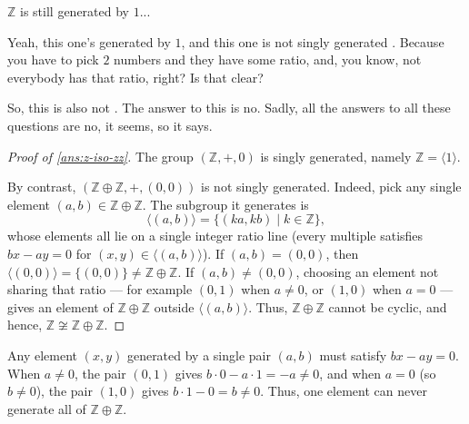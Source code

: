 \begin{student}
$\mathbb{Z}$ is still generated by $1$...
\end{student}

\begin{speech}[00:36:21 - 00:36:49]
Yeah, this one's generated by $1$, and this one is not singly generated . Because you have to pick $2$ numbers and they have some ratio, and, you know, not everybody has that ratio, right? Is that clear?

So, this is also not . The answer to this is no. Sadly, all the answers to all these questions are no, it seems, so it says.
\end{speech}

\begin{content}


\begin{proof}[Proof of \cref{ans:z-iso-zz}]
The group $(\mathbb{Z}, +, 0)$ is singly generated, namely $\mathbb{Z} = \langle 1 \rangle$.

By contrast, $(\mathbb{Z} \oplus \mathbb{Z}, +, (0,0))$ is not singly generated. Indeed, pick any single element $(a, b) \in \mathbb{Z} \oplus \mathbb{Z}$. The subgroup it generates is
\[
\langle (a, b) \rangle = \{ (ka, kb) \mid k \in \mathbb{Z} \},
\]
whose elements all lie on a single integer ratio line (every multiple satisfies $b x - a y = 0$ for $(x, y) \in \langle (a, b) \rangle$). If $(a, b) = (0, 0)$, then $\langle (0,0) \rangle = \{(0,0)\} \neq \mathbb{Z} \oplus \mathbb{Z}$. If $(a, b) \neq (0,0)$, choosing an element not sharing that ratio --- for example $(0, 1)$ when $a \neq 0$, or $(1, 0)$ when $a = 0$ --- gives an element of $\mathbb{Z} \oplus \mathbb{Z}$ outside $\langle (a, b) \rangle$. Thus, $\mathbb{Z} \oplus \mathbb{Z}$ cannot be cyclic, and hence, $\mathbb{Z} \not\cong \mathbb{Z} \oplus \mathbb{Z}$.
\end{proof}

\begin{steps}
Any element $(x, y)$ generated by a single pair $(a, b)$ must satisfy $b x - a y = 0$. When $a \neq 0$, the pair $(0, 1)$ gives $b \cdot 0 - a \cdot 1 = -a \neq 0$, and when $a = 0$ (so $b \neq 0$), the pair $(1, 0)$ gives $b \cdot 1 - 0 = b \neq 0$. Thus, one element can never generate all of $\mathbb{Z} \oplus \mathbb{Z}$.
\end{steps}
\end{content}

